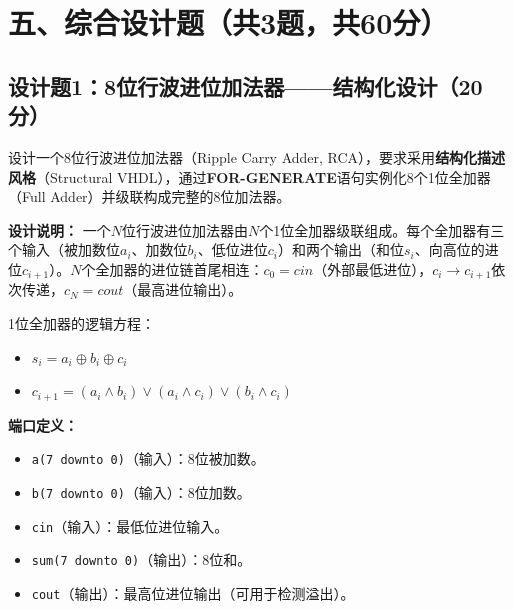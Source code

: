 \newpage

\section*{五、综合设计题（共3题，共60分）}

\subsection*{设计题1：8位行波进位加法器——结构化设计（20分）}

设计一个8位行波进位加法器（Ripple Carry Adder, RCA），要求采用\textbf{结构化描述风格}（Structural VHDL），通过\textbf{FOR-GENERATE}语句实例化8个1位全加器（Full Adder）并级联构成完整的8位加法器。

\vspace{0.3cm}

\textbf{设计说明：}
一个$N$位行波进位加法器由$N$个1位全加器级联组成。每个全加器有三个输入（被加数位$a_i$、加数位$b_i$、低位进位$c_i$）和两个输出（和位$s_i$、向高位的进位$c_{i+1}$）。$N$个全加器的进位链首尾相连：$c_0 = cin$（外部最低进位），$c_i \to c_{i+1}$依次传递，$c_N = cout$（最高进位输出）。

\begin{center}
1位全加器的逻辑方程：
\begin{itemize}
  \item $s_i = a_i \oplus b_i \oplus c_i$
  \item $c_{i+1} = (a_i \land b_i) \lor (a_i \land c_i) \lor (b_i \land c_i)$
\end{itemize}
\end{center}

\vspace{0.3cm}

\textbf{端口定义：}
\begin{itemize}
  \item \texttt{a(7~downto~0)}（输入）：8位被加数。
  \item \texttt{b(7~downto~0)}（输入）：8位加数。
  \item \texttt{cin}（输入）：最低位进位输入。
  \item \texttt{sum(7~downto~0)}（输出）：8位和。
  \item \texttt{cout}（输出）：最高位进位输出（可用于检测溢出）。
\end{itemize}

\vspace{0.3cm}

